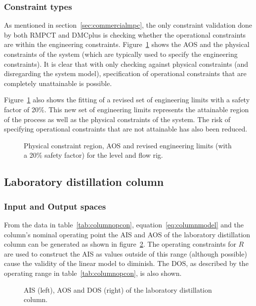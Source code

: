 \subsubsection{Constraint types}
As mentioned in section~\ref{sec:commercialmpc}, the only constraint validation done by both RMPCT and DMCplus is checking whether the operational constraints are within the engineering constraints.
Figure~\ref{fig:flowcontypes} shows the AOS and the physical constraints of the system (which are typically used to specify the engineering constraints).
It is clear that with only checking against physical constraints (and disregarding the system model), specification of operational constraints that are completely unattainable is possible.

Figure~\ref{fig:flowcontypes} also shows the fitting of a revised set of engineering limits with a safety factor of 20\%.
This new set of engineering limits represents the attainable region of the process as well as the physical constraints of the system.
The risk of specifying operational constraints that are not attainable has also been reduced.

\begin{figure}[htbp]
  \centering
    \scalebox{1}{}  
  \caption[Physical constraint region of level and flow rig]{Physical constraint region, AOS and revised engineering limits (with a 20\% safety factor) for the level and flow rig.}
  \label{fig:flowcontypes}
\end{figure}


\subsection{Laboratory distillation column}
\subsubsection{Input and Output spaces}
From the data in table~\ref{tab:columnopcon}, equation~\ref{eq:columnmodel} and the column's nominal operating point the AIS and AOS of the laboratory distillation column can be generated as shown in figure~\ref{fig:columnaisaos}.
The operating constraints for $R$ are used to construct the AIS as values outside of this range (although possible) cause the validity of the linear model to diminish.
The DOS, as described by the operating range in table~\ref{tab:columnopcon}, is also shown.

\begin{figure}[htbp]
  \centering
    \scalebox{1}{}  
    \scalebox{1}{}  
  \caption[AIS, AOS and DOS of the laboratory distillation column]{AIS (left), AOS and DOS (right) of the laboratory distillation column.}
  \label{fig:columnaisaos}
\end{figure}

